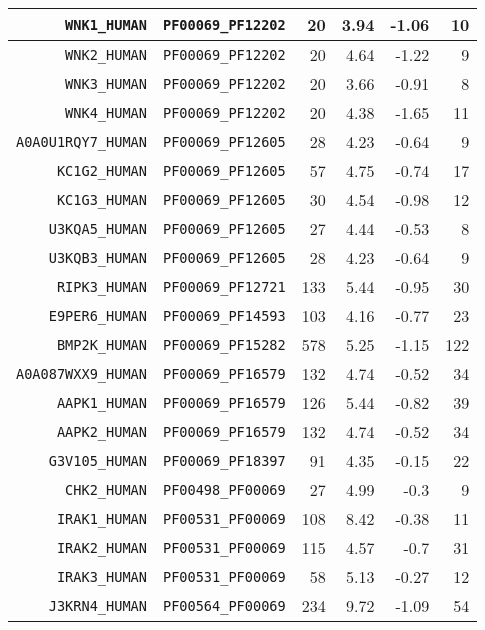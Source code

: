 \begin{longtable}[c]{||r|r|r|r|r|r||}
  \hline
  \texttt{WNK1\_HUMAN} & \texttt{PF00069\_PF12202} & 20 & 3.94 & -1.06 & 10 \\
  \hline
  \texttt{WNK2\_HUMAN} & \texttt{PF00069\_PF12202} & 20 & 4.64 & -1.22 & 9 \\
  \hline
  \texttt{WNK3\_HUMAN} & \texttt{PF00069\_PF12202} & 20 & 3.66 & -0.91 & 8 \\
  \hline
  \texttt{WNK4\_HUMAN} & \texttt{PF00069\_PF12202} & 20 & 4.38 & -1.65 & 11 \\
  \hline
  \texttt{A0A0U1RQY7\_HUMAN} & \texttt{PF00069\_PF12605} & 28 & 4.23 & -0.64 & 9 \\
  \hline
  \texttt{KC1G2\_HUMAN} & \texttt{PF00069\_PF12605} & 57 & 4.75 & -0.74 & 17 \\
  \hline
  \texttt{KC1G3\_HUMAN} & \texttt{PF00069\_PF12605} & 30 & 4.54 & -0.98 & 12 \\
  \hline
  \texttt{U3KQA5\_HUMAN} & \texttt{PF00069\_PF12605} & 27 & 4.44 & -0.53 & 8 \\
  \hline
  \texttt{U3KQB3\_HUMAN} & \texttt{PF00069\_PF12605} & 28 & 4.23 & -0.64 & 9 \\
  \hline
  \texttt{RIPK3\_HUMAN} & \texttt{PF00069\_PF12721} & 133 & 5.44 & -0.95 & 30 \\
  \hline
  \texttt{E9PER6\_HUMAN} & \texttt{PF00069\_PF14593} & 103 & 4.16 & -0.77 & 23 \\
  \hline
  \texttt{BMP2K\_HUMAN} & \texttt{PF00069\_PF15282} & 578 & 5.25 & -1.15 & 122 \\
  \hline
  \texttt{A0A087WXX9\_HUMAN} & \texttt{PF00069\_PF16579} & 132 & 4.74 & -0.52 & 34 \\
  \hline
  \texttt{AAPK1\_HUMAN} & \texttt{PF00069\_PF16579} & 126 & 5.44 & -0.82 & 39 \\
  \hline
  \texttt{AAPK2\_HUMAN} & \texttt{PF00069\_PF16579} & 132 & 4.74 & -0.52 & 34 \\
  \hline
  \texttt{G3V105\_HUMAN} & \texttt{PF00069\_PF18397} & 91 & 4.35 & -0.15 & 22 \\
  \hline
  \texttt{CHK2\_HUMAN} & \texttt{PF00498\_PF00069} & 27 & 4.99 & -0.3 & 9 \\
  \hline
  \texttt{IRAK1\_HUMAN} & \texttt{PF00531\_PF00069} & 108 & 8.42 & -0.38 & 11 \\
  \hline
  \texttt{IRAK2\_HUMAN} & \texttt{PF00531\_PF00069} & 115 & 4.57 & -0.7 & 31 \\
  \hline
  \texttt{IRAK3\_HUMAN} & \texttt{PF00531\_PF00069} & 58 & 5.13 & -0.27 & 12 \\
  \hline
  \texttt{J3KRN4\_HUMAN} & \texttt{PF00564\_PF00069} & 234 & 9.72 & -1.09 & 54 \\

\end{longtable}
